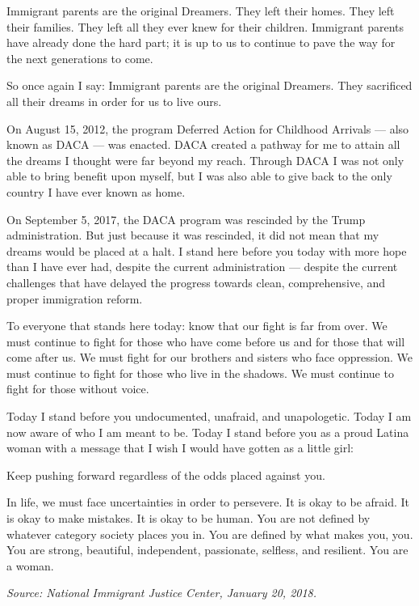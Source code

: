 \documentclass[10pt,a4paper]{article}
\begin{document}
Immigrant parents are the original Dreamers. They left their homes. They left their families. They left all they ever knew for their children. Immigrant parents have already done the hard part; it is up to us to continue to pave the way for the next generations to come.

So once again I say: Immigrant parents are the original Dreamers. They sacrificed all their dreams in order for us to live ours.

On August 15, 2012, the program Deferred Action for Childhood Arrivals — also known as DACA — was enacted. DACA created a pathway for me to attain all the dreams I thought were far beyond my reach. Through DACA I was not only able to bring benefit upon myself, but I was also able to give back to the only country I have ever known as home.

On September 5, 2017, the DACA program was rescinded by the Trump administration. But just because it was rescinded, it did not mean that my dreams would be placed at a halt. I stand here before you today with more hope than I have ever had, despite the current administration — despite the current challenges that have delayed the progress towards clean, comprehensive, and proper immigration reform.

To everyone that stands here today: know that our fight is far from over. We must continue to fight for those who have come before us and for those that will come after us. We must fight for our brothers and sisters who face oppression. We must continue to fight for those who live in the shadows. We must continue to fight for those without voice.

Today I stand before you undocumented, unafraid, and unapologetic. Today I am now aware of who I am meant to be. Today I stand before you as a proud Latina woman with a message that I wish I would have gotten as a little girl:

Keep pushing forward regardless of the odds placed against you.

In life, we must face uncertainties in order to persevere. It is okay to be afraid. It is okay to make mistakes. It is okay to be human. You are not defined by whatever category society places you in. You are defined by what makes you, you. You are strong, beautiful, independent, passionate, selfless, and resilient. You are a woman.

\bigskip
\noindent\textit{Source: National Immigrant Justice Center, January 20, 2018.}
\end{document}
